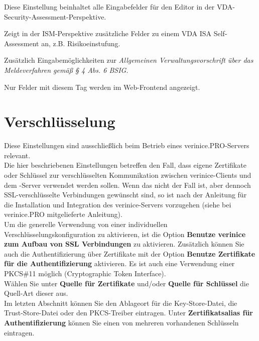\documentclass[a4paper,10pt]{book}
\newcommand*{\descrfont}[1]{\textit{#1 -}}
\begin{document}
\begin{description}[font=\normalfont\descrfont]
	\item[VDA-ISA] Diese Einstellung beinhaltet alle Eingabefelder für den Editor in der VDA-Security-Assessment-Perspektive.
	\item[VDA\_ISA\_Audit] Zeigt in der ISM-Perspektive zusätzliche Felder zu einem VDA ISA Self-Assessment an, z.B. Risikoeinstufung.
	\item[VV-BSIG] Zusätzlich Eingabemöglichkeiten zur \emph{Allgemeinen Verwaltungsvorschrift über das Meldeverfahren gemäß § 4 Abs. 6 BSIG}.
	\item[Web] Nur Felder mit diesem Tag werden im Web-Frontend angezeigt.
\end{description}

\section{Verschlüsselung}
Diese Einstellungen sind ausschließlich beim Betrieb eines verinice.\textsc{PRO}-Servers relevant.
\newline\\
Die hier beschriebenen Einstellungen betreffen den Fall, dass eigene Zertifikate oder Schlüssel zur verschlüsselten Kommunikation
zwischen verinice-Clients und dem -Server verwendet werden sollen. Wenn das nicht der Fall ist, aber dennoch SSL-verschlüsselte
Verbindungen gewünscht sind, so ist nach der Anleitung für die Installation und Integration des verinice-Servers vorzugehen
(siehe bei verinice.\textsc{PRO} mitgelieferte Anleitung).
\newline\\
Um die generelle Verwendung von einer individuellen Verschlüsselungskonfiguration zu aktivieren, ist die Option \textbf{Benutze verinice
zum Aufbau von SSL Verbindungen} zu aktivieren. Zusätzlich können Sie auch die Authentifizierung über Zertifikate mit der Option
\textbf{Benutze Zertifikate für die Authentifizierung} aktivieren. Es ist auch eine Verwendung einer PKCS\#11 möglich (Cryptographic Token Interface).
\newline\\
Wählen Sie unter \textbf{Quelle für Zertifikate} und/oder \textbf{Quelle für Schlüssel} die Quell-Art dieser aus.
\newline\\
Im letzten Abschnitt können Sie den Ablageort für die Key-Store-Datei, die Trust-Store-Datei oder den PKCS-Treiber eintragen.
Unter \textbf{Zertifikatsalias für Authentifizierung} können Sie einen von mehreren vorhandenen Schlüsseln eintragen.
\end{document}
